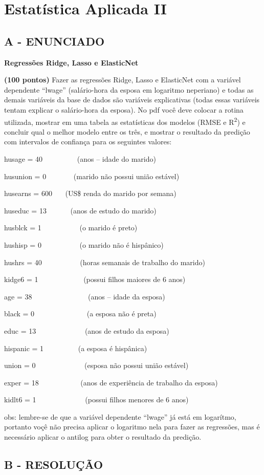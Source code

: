 \label{ap:ap05}
\chapter{Estatística Aplicada II}
\section*{\textbf{A - ENUNCIADO}}

\textbf{Regressões Ridge, Lasso e ElasticNet}


\bigskip

\textbf{(100 pontos) }Fazer as regressões Ridge, Lasso e ElasticNet com a variável dependente “lwage” (salário-hora da
esposa em logaritmo neperiano) e todas as demais variáveis da base de dados são variáveis explicativas (todas essas
variáveis tentam explicar o salário-hora da esposa). No pdf você deve colocar a rotina utilizada, mostrar em uma tabela
as estatísticas dos modelos (RMSE e R\textsuperscript{2}) e concluir qual o melhor modelo entre os três, e mostrar o
resultado da predição com intervalos de confiança para os seguintes valores:

husage = 40 \ \ \ \ \ \ \ \ \ (anos – idade do marido)

husunion = 0 \ \ \ \ \ \ \ (marido não possui união estável)

husearns = 600 \ \ \ (US\$ renda do marido por semana)

huseduc = 13 \ \ \ \ \ \ (anos de estudo do marido)

husblck = 1 \ \ \ \ \ \ \ \ \ \ (o marido é preto)

hushisp = 0 \ \ \ \ \ \ \ \ \ \ (o marido não é hispânico)

hushrs = 40 \ \ \ \ \ \ \ \ \ \ (horas semanais de trabalho do marido)

kidge6 = 1 \ \ \ \ \ \ \ \ \ \ \ \ (possui filhos maiores de 6 anos)

age = 38 \ \ \ \ \ \ \ \ \ \ \ \ \ \ \ (anos – idade da esposa)

black = 0 \ \ \ \ \ \ \ \ \ \ \ \ \ \ (a esposa não é preta)

educ = 13 \ \ \ \ \ \ \ \ \ \ \ \ \ (anos de estudo da esposa)

hispanic = 1 \ \ \ \ \ \ \ \ \ (a esposa é hispânica)

union = 0 \ \ \ \ \ \ \ \ \ \ \ \ \ (esposa não possui união estável)

exper = 18 \ \ \ \ \ \ \ \ \ \ \ (anos de experiência de trabalho da esposa)

kidlt6 = 1 \ \ \ \ \ \ \ \ \ \ \ \ \ (possui filhos menores de 6 anos)


\bigskip

obs: lembre-se de que a variável dependente “lwage” já está em logarítmo, portanto voçê não precisa aplicar o logaritmo
nela para fazer as regressões, mas é necessário aplicar o antilog para obter o resultado da predição. 


\section*{\textbf{B - RESOLUÇÃO}}
\lipsum[30]